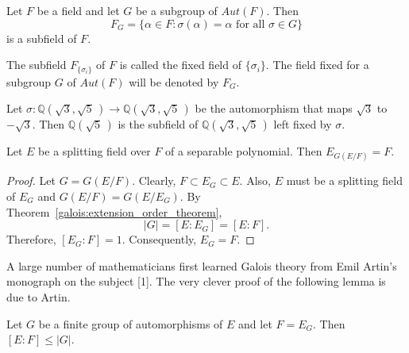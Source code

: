 \begin{corollary}
Let $F$ be a field and let $G$ be a subgroup of $Aut(F)$. Then 
\[
F_G\label{noteFixedG} = \{ \alpha \in F : \sigma( \alpha ) = \alpha
\mbox{ for all $\sigma \in G$} \}
\]
is a subfield of $F$.
\end{corollary}
 
 
 
 
The subfield $F_{ \{\sigma_i \} }$ of $F$ is called the {\bfi fixed
field\/} of $\{ \sigma_i \}$. The field fixed for a
subgroup $G$ of $Aut(F)$ will be denoted by $F_G$. 
 

\begin{example}{}
Let $\sigma : {\mathbb Q}(\sqrt{3}, \sqrt{5}\, ) \rightarrow {\mathbb
Q}(\sqrt{3}, \sqrt{5}\, )$ be the automorphism that maps $\sqrt{3}$ to
$-\sqrt{3}$. Then ${\mathbb Q}( \sqrt{5}\, )$ is the subfield of 
${\mathbb Q}(\sqrt{3}, \sqrt{5}\, )$ left fixed by $\sigma$.
\mbox{\hspace{1in}}
\end{example}
 
 
\begin{proposition}\label{galois:fixed_field_prop}
Let $E$ be a splitting field over $F$ of a separable polynomial.
Then $E_{G(E/F)} = F$.
\end{proposition}
 
 
\begin{proof}
Let $G = G(E/F)$. Clearly, $F \subset E_G \subset E$. Also, $E$ 
must be a splitting field of $E_G$ and $G(E/F) = G(E/E_G)$. By
Theorem~\ref{galois:extension_order_theorem},
\[
|G| = [E: E_G] =[ E:F].
\]
Therefore, $[E_G : F ] =1$. Consequently,  $E_G = F$.
\end{proof}
 
 
\medskip
 
 
A large number of mathematicians first learned Galois theory from
Emil Artin's monograph on the subject [1]. The very clever proof of
the following lemma is due to Artin. 
 
 
\begin{lemma}
Let $G$ be a finite group of automorphisms of $E$ and let $F = E_G$.
Then $[E:F] \leq |G|$.
\end{lemma}
 
